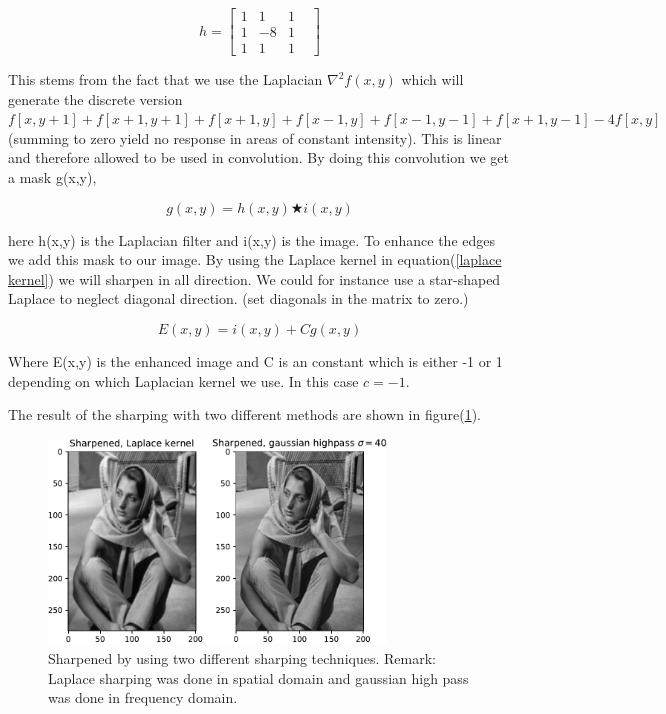 {\begin{equation}
    h = \begin{bmatrix}
        1 & 1 & 1 & \\
        1 & -8 & 1\\
        1 & 1 & 1
    \end{bmatrix}
    \label{laplace kernel}
\end{equation}

This stems from the fact that we use the Laplacian $\nabla^2 f(x,y)$ which will generate the discrete version $f[x,y+1] + f[x+1,y+1] + f[x+1,y] + f[x-1,y] + f[x-1,y-1] + f[x+1,y-1] - 4f[x,y]$(summing to zero yield no response in areas of constant intensity). This is linear and therefore allowed to be used in convolution. By doing this convolution we get a mask g(x,y),

\begin{figure}[!htb]
    \begin{equation}
        g(x,y) = h(x,y) \bigstar i(x,y)
    \end{equation}
    \end{figure}

here h(x,y) is the Laplacian filter and i(x,y) is the image. To enhance the edges we add this mask to our image. By using the Laplace kernel in equation(\ref{laplace kernel}) we will sharpen in all direction. We could for instance use a star-shaped Laplace to neglect diagonal direction. (set diagonals in the matrix to zero.)

\begin{figure}[!htb]
    \begin{equation}
        E(x,y) = i(x,y) + Cg(x,y)
    \end{equation}
    \end{figure}
Where E(x,y) is the enhanced image and C is an constant which is either -1 or 1 depending on which Laplacian kernel we use. In this case $c = -1$.

The result of the sharping with two different methods are shown in figure(\ref{sharpened}).

\begin{figure}[!htb]
    {\centering
        \includegraphics[width=0.80\textwidth]{sharpened.pdf}
        \caption{Sharpened by using two different sharping techniques. Remark: Laplace sharping was done in spatial domain and gaussian high pass was done in frequency domain.}
        \label{sharpened}
    \par}
    \end{figure}

}
